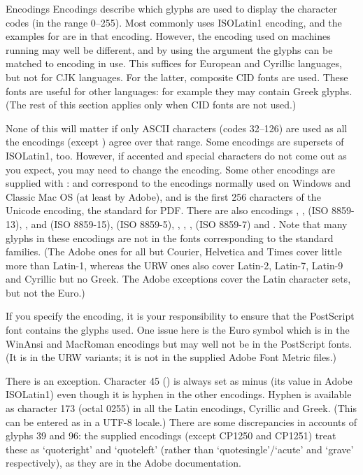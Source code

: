 %
\begin{Section}{Encodings}
Encodings describe which glyphs are used to display the character codes
(in the range 0--255).  Most commonly \R{} uses ISOLatin1 encoding, and
the examples for  are in that encoding.  However,
the encoding used on machines running \R{} may well be different, and by
using the  argument the glyphs can be matched to
encoding in use.  This suffices for European and Cyrillic languages,
but not for CJK languages.  For the latter, composite CID fonts are
used.  These fonts are useful for other languages: for example they
may contain Greek glyphs. (The rest of this section applies only when CID
fonts are not used.)

None of this will matter if only ASCII characters (codes 32--126) are
used as all the encodings (except ) agree over that
range.  Some encodings are supersets of ISOLatin1, too.  However, if
accented and special characters do not come out as you expect, you may
need to change the encoding.  Some other encodings are supplied with
\R{}:  and  correspond to the
encodings normally used on Windows and Classic Mac OS (at least by
Adobe), and  is the first 256 characters of the
Unicode encoding, the standard for PDF.  There are also encodings
, , 
(ISO 8859-13), , and  (ISO
8859-15),  (ISO 8859-5), ,
, ,  (ISO
8859-7) and .  Note that many glyphs in these
encodings are not in the fonts corresponding to the standard families.
(The Adobe ones for all but Courier, Helvetica and Times cover little
more than Latin-1, whereas the URW ones also cover Latin-2, Latin-7,
Latin-9 and Cyrillic but no Greek.  The Adobe exceptions cover the
Latin character sets, but not the Euro.)

If you specify the encoding, it is your responsibility to ensure that
the PostScript font contains the glyphs used.  One issue here is the Euro
symbol which is in the WinAnsi and MacRoman encodings but may well not
be in the PostScript fonts.  (It is in the URW variants; it is not in
the supplied Adobe Font Metric files.)

There is an exception.  Character 45 () is always set
as minus (its value in Adobe ISOLatin1) even though it is hyphen in
the other encodings.  Hyphen is available as character 173 (octal
0255) in all the Latin encodings, Cyrillic and Greek.  (This can be
entered as  in a UTF-8 locale.)  There are some
discrepancies in accounts of glyphs 39 and 96: the supplied encodings
(except CP1250 and CP1251) treat these as `quoteright' and
`quoteleft' (rather than `quotesingle'/`acute'
and `grave' respectively), as they are in the Adobe
documentation.
\end{Section}
